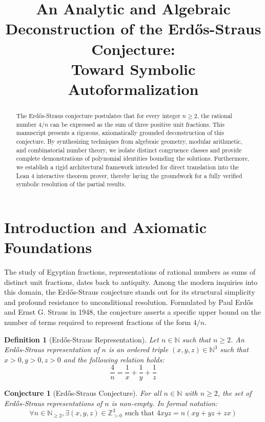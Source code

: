 \documentclass[12pt,a4paper]{article}
\title{An Analytic and Algebraic Deconstruction of the Erd\H{o}s-Straus Conjecture: \\ Toward Symbolic Autoformalization}
\author{}
\date{}
\newtheorem{conjecture}[theorem]{Conjecture}
\newtheorem{definition}[theorem]{Definition}
\begin{document}
\maketitle

\begin{abstract}
The Erd\H{o}s-Straus conjecture postulates that for every integer $n \geq 2$, the rational number $4/n$ can be expressed as the sum of three positive unit fractions. This manuscript presents a rigorous, axiomatically grounded deconstruction of this conjecture. By synthesizing techniques from algebraic geometry, modular arithmetic, and combinatorial number theory, we isolate distinct congruence classes and provide complete demonstrations of polynomial identities bounding the solutions. Furthermore, we establish a rigid architectural framework intended for direct translation into the Lean 4 interactive theorem prover, thereby laying the groundwork for a fully verified symbolic resolution of the partial results.
\end{abstract}

\tableofcontents
\newpage

\section{Introduction and Axiomatic Foundations}

The study of Egyptian fractions, representations of rational numbers as sums of distinct unit fractions, dates back to antiquity. Among the modern inquiries into this domain, the Erd\H{o}s-Straus conjecture stands out for its structural simplicity and profound resistance to unconditional resolution. Formulated by Paul Erd\H{o}s and Ernst G. Straus in 1948, the conjecture asserts a specific upper bound on the number of terms required to represent fractions of the form $4/n$.

\begin{definition}[Erd\H{o}s-Straus Representation]
Let $n \in \mathbb{N}$ such that $n \geq 2$. An Erd\H{o}s-Straus representation of $n$ is an ordered triple $(x, y, z) \in \mathbb{N}^3$ such that $x > 0, y > 0, z > 0$ and the following relation holds:
\begin{equation}
\frac{4}{n} = \frac{1}{x} + \frac{1}{y} + \frac{1}{z}
\end{equation}
\end{definition}

\begin{conjecture}[Erd\H{o}s-Straus Conjecture]
\label{conj:es}
For all $n \in \mathbb{N}$ with $n \geq 2$, the set of Erd\H{o}s-Straus representations of $n$ is non-empty. In formal notation:
\begin{equation}
\forall n \in \mathbb{N}_{\geq 2}, \exists (x, y, z) \in \mathbb{Z}_{>0}^3 \text{ such that } 4xyz = n(xy + yz + zx)
\end{equation}
\end{conjecture}
\end{document}
